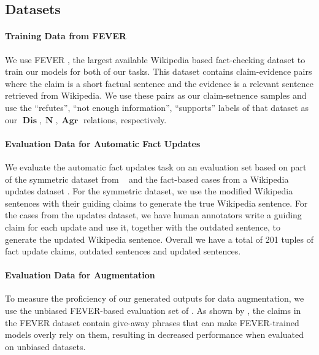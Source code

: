 \documentclass[letterpaper]{article} %
\DeclareMathOperator{\A}{\boldsymbol{Agr}}
\DeclareMathOperator{\D}{\boldsymbol{Dis}}
\DeclareMathOperator{\N}{\boldsymbol{N}}
\begin{document}
\subsection{Datasets}


\paragraph{Training Data from FEVER}
We use FEVER \cite{fever}, the largest available Wikipedia based fact-checking dataset to train our models for both of our tasks. This dataset contains claim-evidence pairs where the claim is a short factual sentence and the evidence is a relevant sentence retrieved from Wikipedia.
We use these pairs as our claim-setnence samples and use the ``refutes'', ``not enough information'', ``supports'' labels of that dataset as our $\D, \N, \A$ relations, respectively.



\paragraph{Evaluation Data for Automatic Fact Updates}
We evaluate the automatic fact updates task on an evaluation set based on part of the symmetric dataset from ~\cite{schuster2019towards} and the fact-based cases from a Wikipedia updates dataset \cite{yang-etal-2017-identifying-semantic}. For the symmetric dataset, we use the modified Wikipedia sentences with their guiding claims to generate the true Wikipedia sentence. For the cases from the updates dataset, we have human annotators write a guiding claim for each update and use it, together with the outdated sentence, to generate the updated Wikipedia sentence.
Overall we have a total of 201 tuples of fact update claims, outdated sentences and updated sentences.


 



\paragraph{Evaluation Data for Augmentation}


To measure the proficiency of our generated outputs for data augmentation, we use the unbiased FEVER-based evaluation set of \cite{schuster2019towards}.
As shown by \cite{schuster2019towards}, the claims in the FEVER dataset contain give-away phrases that can make FEVER-trained models overly rely on them, resulting in decreased performance when evaluated on unbiased datasets. 
\end{document}
